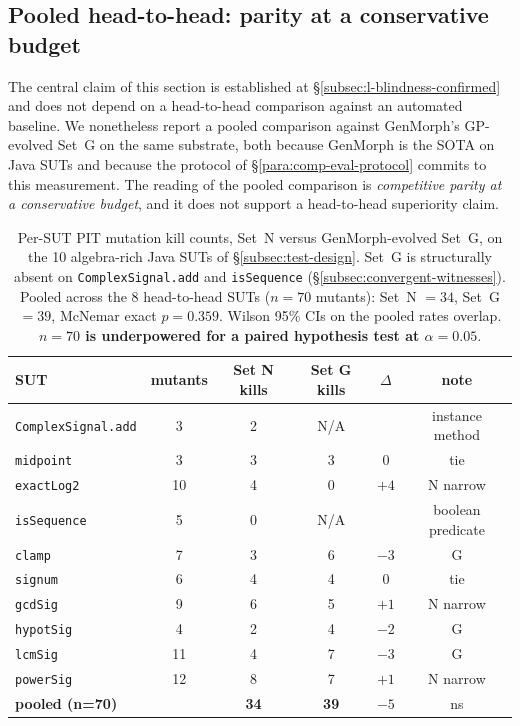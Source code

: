 \subsection{Pooled head-to-head: parity at a conservative budget}
\label{subsec:pooled-headtohead}

The central claim of this section is established at
\S\ref{subsec:l-blindness-confirmed} and does not depend on a
head-to-head comparison against an automated baseline. We nonetheless
report a pooled comparison against GenMorph's GP-evolved Set~G on the
same substrate, both because GenMorph is the SOTA on Java SUTs and
because the protocol of \S\ref{para:comp-eval-protocol} commits to
this measurement. The reading of the pooled comparison is
\emph{competitive parity at a conservative budget}, and it does not
support a head-to-head superiority claim.

\begin{table}[h]
\centering
\caption{Per-SUT PIT mutation kill counts, Set~N versus
GenMorph-evolved Set~G, on the 10 algebra-rich Java SUTs of
\S\ref{subsec:test-design}. Set~G is structurally absent on
\texttt{ComplexSignal.add} and \texttt{isSequence}
(\S\ref{subsec:convergent-witnesses}). Pooled across the 8
head-to-head SUTs ($n = 70$ mutants): Set~N $= 34$, Set~G $= 39$,
McNemar exact $p = 0.359$. Wilson 95\% CIs on the pooled rates
overlap. \textbf{$n = 70$ is underpowered for a paired hypothesis
test at $\alpha = 0.05$}.}
\label{tab:algebra-rich-pooled}
\small
\begin{tabular}{lccccc}
\toprule
SUT & mutants & Set N kills & Set G kills & $\Delta$ & note \\
\midrule
\texttt{ComplexSignal.add} &  3 & 2 & N/A &      & instance method \\
\texttt{midpoint}          &  3 & 3 & 3   & $0$  & tie \\
\texttt{exactLog2}         & 10 & 4 & 0   & $+4$ & N narrow \\
\texttt{isSequence}        &  5 & 0 & N/A &      & boolean predicate \\
\texttt{clamp}             &  7 & 3 & 6   & $-3$ & G \\
\texttt{signum}            &  6 & 4 & 4   & $0$  & tie \\
\texttt{gcdSig}            &  9 & 6 & 5   & $+1$ & N narrow \\
\texttt{hypotSig}          &  4 & 2 & 4   & $-2$ & G \\
\texttt{lcmSig}            & 11 & 4 & 7   & $-3$ & G \\
\texttt{powerSig}          & 12 & 8 & 7   & $+1$ & N narrow \\
\midrule
\textbf{pooled (n=70)}     &    & \textbf{34} & \textbf{39} & $-5$ & ns \\
\bottomrule
\end{tabular}
\end{table}

